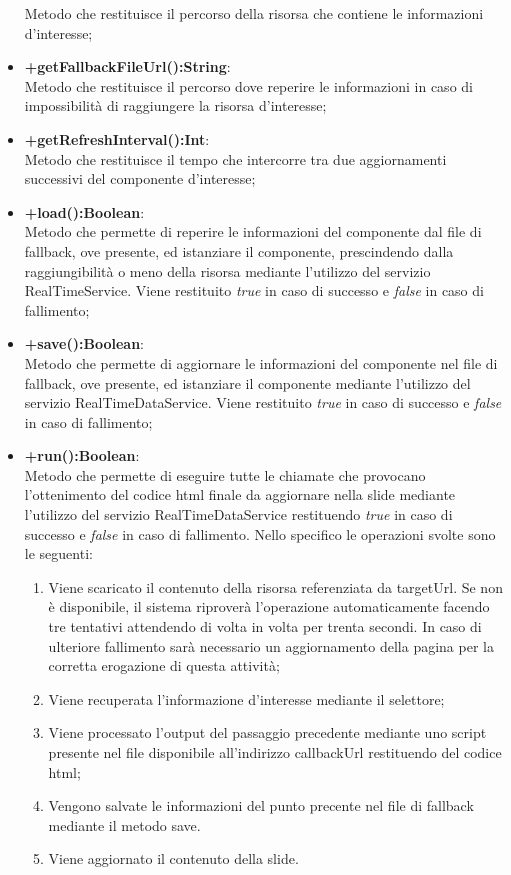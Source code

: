 \begin{itemize}
		Metodo che restituisce il percorso della risorsa che contiene le informazioni d'interesse;
	\item \textbf{+getFallbackFileUrl():String}:\\
		Metodo che restituisce il percorso dove reperire le informazioni in caso di impossibilità di raggiungere la risorsa d'interesse;
	\item \textbf{+getRefreshInterval():Int}:\\
		Metodo che restituisce il tempo che intercorre tra due aggiornamenti successivi del componente d'interesse;			
	\item \textbf{+load():Boolean}:\\	
		Metodo che permette di reperire le informazioni del componente dal file di fallback, ove presente, ed istanziare il componente, prescindendo dalla raggiungibilità o meno della risorsa mediante l'utilizzo del servizio RealTimeService. Viene restituito \textit{true} in caso di successo e \textit{false} in caso di fallimento;
	\item \textbf{+save():Boolean}:\\	
		Metodo che permette di aggiornare le informazioni del componente nel file di fallback, ove presente, ed istanziare il componente mediante l'utilizzo del servizio RealTimeDataService. Viene restituito \textit{true} in caso di successo e \textit{false} in caso di fallimento;
	\item \textbf{+run():Boolean}:\\
		Metodo che permette di eseguire tutte le chiamate che provocano l'ottenimento del codice html finale da aggiornare nella slide mediante l'utilizzo del servizio RealTimeDataService restituendo \textit{true} in caso di successo e \textit{false} in caso di fallimento.
		Nello specifico le operazioni svolte sono le seguenti:
		\begin{enumerate}
			\item Viene scaricato il contenuto della risorsa referenziata da targetUrl. Se non è disponibile, il sistema riproverà l'operazione automaticamente facendo tre tentativi attendendo di volta in volta per trenta secondi. In caso di ulteriore fallimento sarà necessario un aggiornamento della pagina per la corretta erogazione di questa attività;
			\item Viene recuperata l'informazione d'interesse mediante il selettore;
			\item Viene processato l'output del passaggio precedente mediante uno script presente nel file disponibile all'indirizzo callbackUrl restituendo del codice html;
			\item Vengono salvate le informazioni del punto precente nel file di fallback mediante il metodo save.
			\item Viene aggiornato il contenuto della slide.
		\end{enumerate}
	
	\end{itemize}
